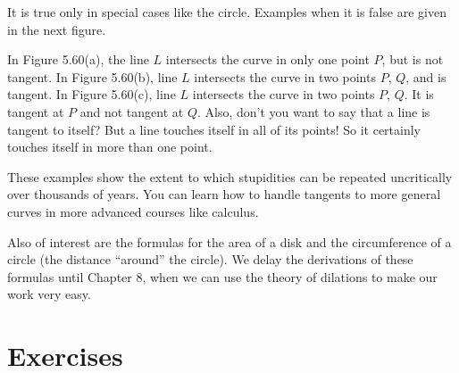 \documentclass[12pt]{book} %
\begin{document}
It is true only in special cases like the circle. Examples when it is false are given in the next figure.


In Figure 5.60(a), the line $L$ intersects the curve in only one point $P$, but is not tangent. In Figure 5.60(b), line $L$ intersects the curve in two points $P$, $Q$, and is tangent. In Figure 5.60(c), line $L$ intersects the curve in two points $P$, $Q$. It is tangent at $P$ and not tangent at $Q$. Also, don't you want to say that a line is tangent to itself? But a line touches itself in all of its points! So it certainly touches itself in more than one point.

These examples show the extent to which stupidities can be repeated uncritically over thousands of years. You can learn how to handle tangents to more general curves in more advanced courses like calculus.

Also of interest are the formulas for the area of a disk and the circumference of a circle (the distance ``around'' the circle). We delay the derivations of these formulas until Chapter 8, when we can use the theory of dilations to make our work very easy.

\section*{Exercises}
\end{document}
